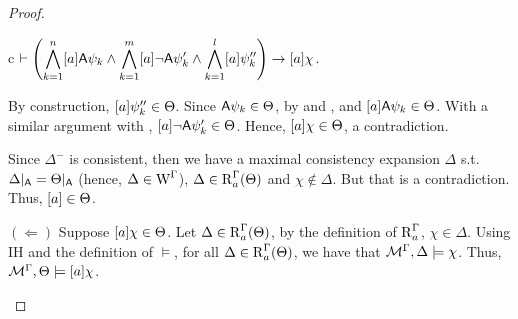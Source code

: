 \begin{proof}
\begin{itemize}
\begin{ctabular}{c}
$\vdash
\displaystyle
\left( \bigwedge_{k=1}^{n} [a]{\sf A}\psi_k \land \bigwedge_{k=1}^{m} [a]\lnot {\sf A}\psi'_k \land \bigwedge_{k=1}^{l} [a]\psi''_k \right)
\rightarrow [a] \chi$.
\end{ctabular}

By construction, $[a]\psi''_k \in \Theta$. Since ${\sf A}\psi_k \in \Theta$, by  and , and $[a]{\sf A}\psi_k \in \Theta$. With a similar argument with , $[a]\neg{\sf A}\psi'_k \in \Theta$.
Hence, $[a]\chi \in \Theta$, a contradiction.

Since $\Delta^-$ is consistent, then we have a maximal consistency expansion $\Delta$ s.t. $\Delta\vert_{{\sf A}} = \Theta\vert_{{\sf A}}$ (hence, $\Delta \in \operatorname{W}^\Gamma$), $\Delta \in \operatorname{R}^\Gamma_a(\Theta)$ and $\chi \notin \Delta$.
But that is a contradiction. Thus, $[a] \in \Theta$.

$(\Leftarrow)$ Suppose $[a]\chi \in \Theta$. Let $\Delta \in \operatorname{R}^\Gamma_a(\Theta)$, by the definition of $\operatorname{R}^\Gamma_a$, $\chi \in \Delta$.
Using IH and the definition of $\models$, for all $\Delta \in \operatorname{R}^\Gamma_a(\Theta)$, we have that $\mathcal{M}^\Gamma,\Delta \models \chi$.
Thus, $\mathcal{M}^\Gamma, \Theta \models [a]\chi$.


\end{itemize}
\end{proof}
